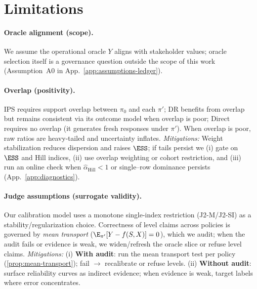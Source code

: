 \section{Limitations}
\label{sec:limitations}

\paragraph{Oracle alignment (scope).}
We assume the operational oracle $Y$ aligns with stakeholder values; oracle selection itself is a governance question outside the scope of this work (Assumption~A0 in App.~\ref{app:assumptions-ledger}).

\paragraph{Overlap (positivity).}
IPS requires support overlap between $\pi_0$ and each $\pi'$; DR benefits from overlap but remains consistent via its outcome model when overlap is poor; Direct requires no overlap (it generates fresh responses under $\pi'$).
When overlap is poor, raw ratios are heavy-tailed and uncertainty inflates.
\emph{Mitigations:} Weight stabilization reduces dispersion and raises $\ESS$; if tails persist we (i) gate on $\ESS$ and Hill indices, (ii) use overlap weighting or cohort restriction, and (iii) run an online check when $\widehat{\alpha}_{\text{Hill}}{<}1$ or single–row dominance persists (App.~\ref{app:diagnostics}).

\paragraph{Judge assumptions (surrogate validity).}
Our calibration model uses a monotone single-index restriction (J2-M/J2-SI) as a stability/regularization choice. Correctness of level claims across policies is governed by \emph{mean transport} ($\E_{\pi'}[Y - f(S,X)] = 0$), which we audit; when the audit fails or evidence is weak, we widen/refresh the oracle slice or refuse level claims.
\emph{Mitigations:} (i) \textbf{With audit}: run the mean transport test per policy (\cref{prop:mean-transport}); fail $\to$ recalibrate or refuse levels. (ii) \textbf{Without audit}: surface reliability curves as indirect evidence; when evidence is weak, target labels where error concentrates.

